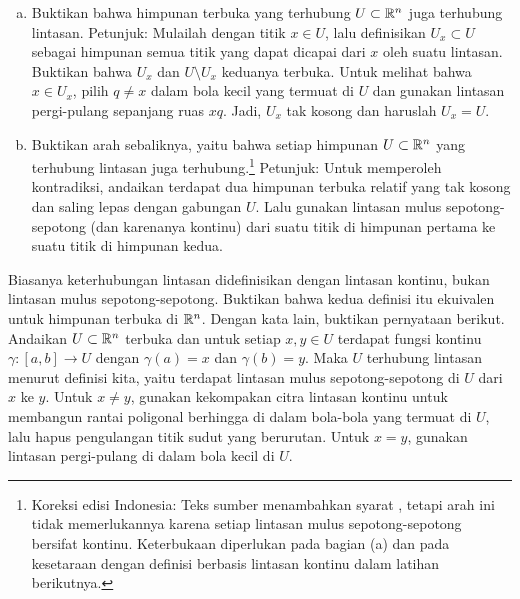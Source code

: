 \begin{exercise}
\pagebreak[2]
\leavevmode
\begin{enumerate}[a)]
\item
Buktikan bahwa himpunan terbuka yang terhubung $U \subset {\mathbb{R}}^n$ juga terhubung
lintasan. Petunjuk: Mulailah dengan titik $x \in U$, lalu definisikan
$U_x \subset U$ sebagai himpunan semua titik yang dapat dicapai dari $x$ oleh
suatu lintasan. Buktikan bahwa $U_x$ dan $U \setminus U_x$ keduanya terbuka.
Untuk melihat bahwa $x\in U_x$, pilih $q\neq x$ dalam bola kecil yang termuat di
$U$ dan gunakan lintasan pergi-pulang sepanjang ruas $xq$. Jadi, $U_x$ tak
kosong dan haruslah $U_x = U$.
\item
Buktikan arah sebaliknya, yaitu bahwa setiap himpunan
$U \subset {\mathbb{R}}^n$ yang terhubung lintasan juga terhubung.\footnote{Koreksi edisi
Indonesia: Teks sumber menambahkan syarat , tetapi arah ini
tidak memerlukannya karena setiap lintasan mulus sepotong-sepotong bersifat
kontinu. Keterbukaan diperlukan pada bagian (a) dan pada kesetaraan dengan
definisi berbasis lintasan kontinu dalam latihan berikutnya.} Petunjuk: Untuk
memperoleh kontradiksi, andaikan terdapat dua himpunan terbuka relatif yang tak
kosong dan saling lepas dengan gabungan $U$. Lalu gunakan lintasan mulus
sepotong-sepotong (dan karenanya kontinu) dari suatu titik di himpunan pertama
ke suatu titik di himpunan kedua.
\end{enumerate}
\end{exercise}

\begin{exercise}
Biasanya keterhubungan lintasan didefinisikan dengan lintasan kontinu, bukan
lintasan mulus sepotong-sepotong. Buktikan bahwa kedua definisi itu ekuivalen
untuk himpunan terbuka di ${\mathbb{R}}^n$. Dengan kata lain, buktikan pernyataan berikut.\\
Andaikan $U \subset {\mathbb{R}}^n$ terbuka dan untuk setiap $x,y \in U$ terdapat fungsi
kontinu $\gamma \colon [a,b] \to U$ dengan $\gamma(a) = x$ dan
$\gamma(b) = y$. Maka $U$ terhubung lintasan menurut definisi kita, yaitu
terdapat lintasan mulus sepotong-sepotong di $U$ dari $x$ ke $y$. Untuk
$x\neq y$, gunakan kekompakan citra lintasan kontinu untuk membangun rantai
poligonal berhingga di dalam bola-bola yang termuat di $U$, lalu hapus
pengulangan titik sudut yang berurutan. Untuk $x=y$, gunakan lintasan pergi-pulang di
dalam bola kecil di $U$.
\end{exercise}


